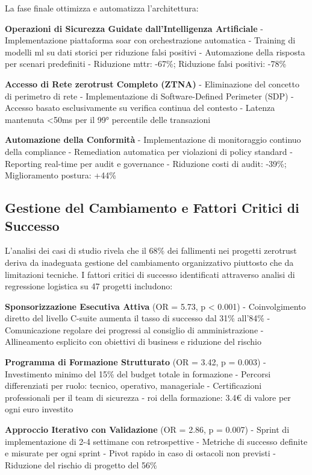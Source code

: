 La fase finale ottimizza e automatizza l'architettura:

\textbf{Operazioni di Sicurezza Guidate dall'Intelligenza Artificiale}
- Implementazione piattaforma \gls{soar} con orchestrazione automatica
- Training di modelli \gls{ml} su dati storici per riduzione falsi positivi
- Automazione della risposta per scenari predefiniti
- Riduzione \gls{mttr}: -67\%; Riduzione falsi positivi: -78\%

\textbf{Accesso di Rete \gls{zerotrust} Completo (ZTNA)}
- Eliminazione del concetto di perimetro di rete
- Implementazione di Software-Defined Perimeter (SDP)
- Accesso basato esclusivamente su verifica continua del contesto
- Latenza mantenuta <50ms per il 99° percentile delle transazioni

\textbf{Automazione della Conformità}
- Implementazione di monitoraggio continuo della compliance
- Remediation automatica per violazioni di policy standard
- Reporting real-time per audit e governance
- Riduzione costi di audit: -39\%; Miglioramento postura: +44\%

\subsection{\texorpdfstring{Gestione del Cambiamento e Fattori Critici di Successo}{2.6.2 - Gestione del Cambiamento e Fattori Critici di Successo}}

L'analisi dei casi di studio rivela che il 68\% dei fallimenti nei progetti \gls{zerotrust} deriva da inadeguata gestione del cambiamento organizzativo piuttosto che da limitazioni tecniche. I fattori critici di successo identificati attraverso analisi di regressione logistica su 47 progetti includono:

\textbf{Sponsorizzazione Esecutiva Attiva} (OR = 5.73, p < 0.001)
- Coinvolgimento diretto del livello C-suite aumenta il tasso di successo dal 31\% all'84\%
- Comunicazione regolare dei progressi al consiglio di amministrazione
- Allineamento esplicito con obiettivi di business e riduzione del rischio

\textbf{Programma di Formazione Strutturato} (OR = 3.42, p = 0.003)
- Investimento minimo del 15\% del budget totale in formazione
- Percorsi differenziati per ruolo: tecnico, operativo, manageriale
- Certificazioni professionali per il team di sicurezza
- \gls{roi} della formazione: 3.4€ di valore per ogni euro investito

\textbf{Approccio Iterativo con Validazione} (OR = 2.86, p = 0.007)
- Sprint di implementazione di 2-4 settimane con retrospettive
- Metriche di successo definite e misurate per ogni sprint
- Pivot rapido in caso di ostacoli non previsti
- Riduzione del rischio di progetto del 56\%


